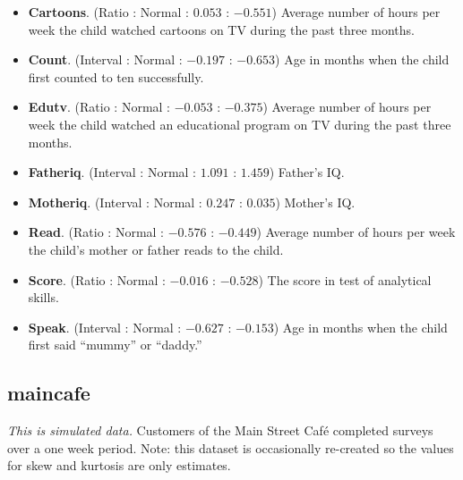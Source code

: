 \begin{itemize}
  \item \textbf{Cartoons}. (Ratio : Normal : $ 0.053 $ : $ -0.551 $) Average number of hours per week the child watched cartoons on TV during the past three months.
  \item \textbf{Count}. (Interval : Normal : $ -0.197 $ : $ -0.653 $) Age in months when the child first counted to ten successfully.
  \item \textbf{Edutv}. (Ratio : Normal : $ -0.053 $ : $ -0.375 $) Average number of hours per week the child watched an educational program on TV during the past three months.
  \item \textbf{Fatheriq}. (Interval : Normal : $ 1.091 $ : $ 1.459 $) Father's IQ.
  \item \textbf{Motheriq}. (Interval : Normal : $ 0.247 $ : $ 0.035 $) Mother's IQ.
  \item \textbf{Read}. (Ratio : Normal : $ -0.576 $ : $ -0.449 $) Average number of hours per week the child's mother or father reads to the child.
  \item \textbf{Score}. (Ratio : Normal : $ -0.016 $ : $ -0.528 $) The score in test of analytical skills.
  \item \textbf{Speak}. (Interval : Normal : $ -0.627 $ : $ -0.153 $) Age in months when the child first said ``mummy'' or ``daddy.''
\end{itemize}

\subsection{maincafe}

\textit{This is simulated data.} Customers of the Main Street Caf\'{e} completed surveys over a one week period. Note: this dataset is occasionally re-created so the values for skew and kurtosis are only estimates.

